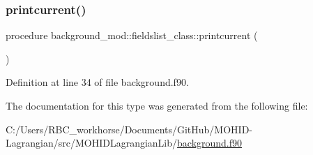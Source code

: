 \subsubsection{\texorpdfstring{printcurrent()}{printcurrent()}}
{\footnotesize\ttfamily procedure background\+\_\+mod\+::fieldslist\+\_\+class\+::printcurrent (\begin{DoxyParamCaption}{ }\end{DoxyParamCaption})\hspace{0.3cm}{\ttfamily [private]}}



Definition at line 34 of file background.\+f90.



The documentation for this type was generated from the following file\+:\begin{DoxyCompactItemize}
\item 
C\+:/\+Users/\+R\+B\+C\+\_\+workhorse/\+Documents/\+Git\+Hub/\+M\+O\+H\+I\+D-\/\+Lagrangian/src/\+M\+O\+H\+I\+D\+Lagrangian\+Lib/\mbox{\hyperlink{background_8f90}{background.\+f90}}\end{DoxyCompactItemize}
